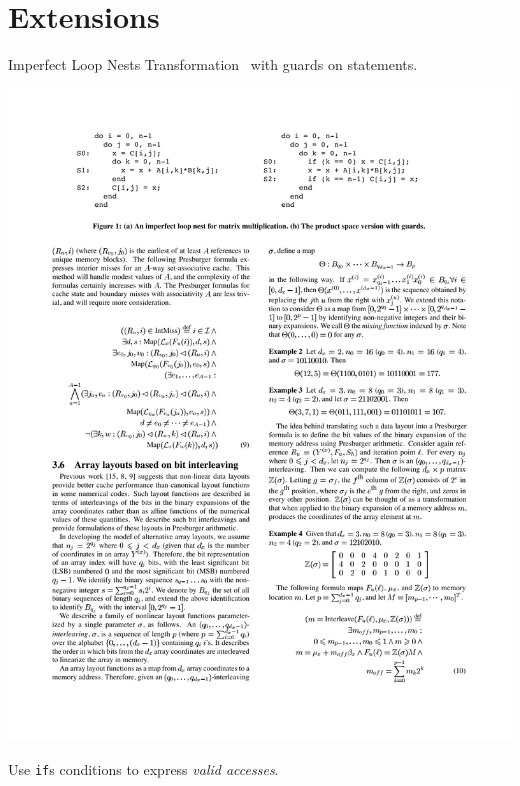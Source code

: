 \documentclass{beamer}
\begin{document}
\section{Extensions}

\begin{frame}{Imperfect Loop Nests}
  Transformation~\cite{ahmed2001synthesizing} with guards on statements.
  \begin{center}
    \includegraphics[trim={0 0.6cm 0 0}, clip, width=1.1\textwidth]{figure1}
  \end{center}
  Use \texttt{if}s conditions to express \textit{valid accesses}.
\end{frame}
\end{document}
